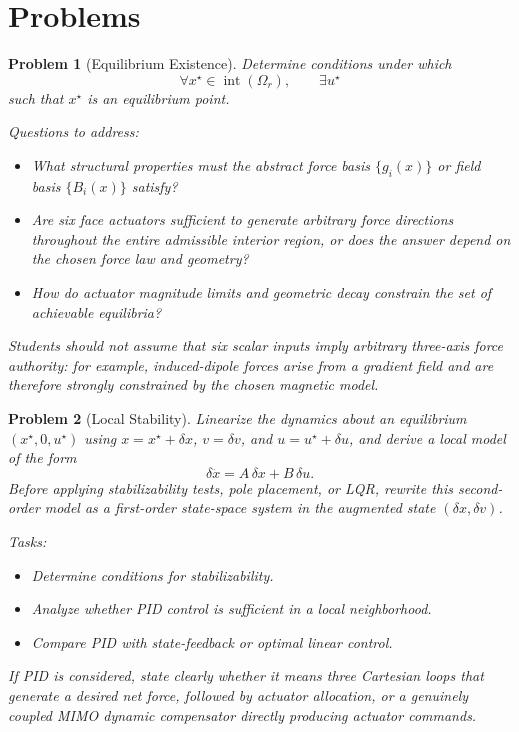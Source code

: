 \documentclass[11pt]{article}
\newtheorem{problem}{Problem}
\begin{document}
\section{Problems}

\begin{problem}[Equilibrium Existence]
Determine conditions under which
\[
\forall x^\star\in\operatorname{int}(\Omega_r),\qquad \exists u^\star
\]
such that $x^\star$ is an equilibrium point.

Questions to address:
\begin{itemize}[leftmargin=1.5em]
    \item What structural properties must the abstract force basis $\{g_i(x)\}$ or field basis $\{B_i(x)\}$ satisfy?
    \item Are six face actuators sufficient to generate arbitrary force directions throughout the entire admissible interior region, or does the answer depend on the chosen force law and geometry?
    \item How do actuator magnitude limits and geometric decay constrain the set of achievable equilibria?
\end{itemize}
\noindent Students should not assume that six scalar inputs imply arbitrary three-axis force authority: for example, induced-dipole forces arise from a gradient field and are therefore strongly constrained by the chosen magnetic model.
\end{problem}

\begin{problem}[Local Stability]
Linearize the dynamics about an equilibrium $(x^\star,0,u^\star)$ using $x=x^\star+\delta x$, $v=\delta v$, and $u=u^\star+\delta u$, and derive a local model of the form
\[
\delta \ddot x = A\,\delta x + B\,\delta u.
\]
Before applying stabilizability tests, pole placement, or LQR, rewrite this second-order model as a first-order state-space system in the augmented state $(\delta x,\delta v)$.

Tasks:
\begin{itemize}[leftmargin=1.5em]
    \item Determine conditions for stabilizability.
    \item Analyze whether PID control is sufficient in a local neighborhood.
    \item Compare PID with state-feedback or optimal linear control.
\end{itemize}
\noindent If PID is considered, state clearly whether it means three Cartesian loops that generate a desired net force, followed by actuator allocation, or a genuinely coupled MIMO dynamic compensator directly producing actuator commands.
\end{problem}
\end{document}
